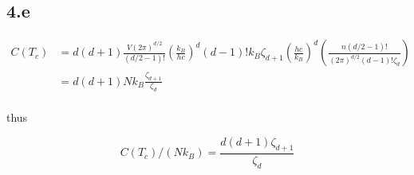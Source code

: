 \documentclass{article}
\begin{document}
\subsection*{4.e}

$$
\begin{aligned}
    C(T_c) &= d(d+1) \frac{V (2\pi)^{d/2}}{(d/2 - 1)!} (\frac{k_B}{h c})^d (d-1)! k_B \zeta_{d+1} (\frac{hc}{k_B})^d (\frac{n (d/2 - 1)!}{(2\pi)^{d/2} (d-1)! \zeta_d})\\
    &=d(d+1) N k_B  \frac{\zeta_{d+1}}{\zeta_d}\\
\end{aligned}
$$

thus

$$
C(T_c)/(Nk_B) = \frac{d(d+1)\zeta_{d+1}}{\zeta_d}
$$
\end{document}
